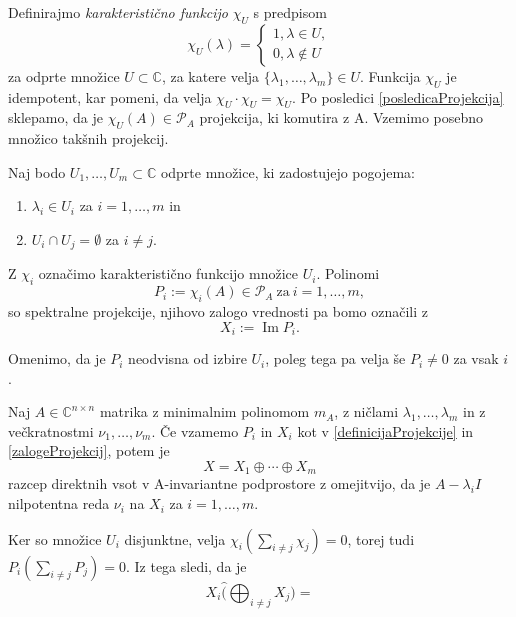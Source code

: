 \documentclass[mat1]{fmfdelo}
\newcommand{\C}{\mathbb C}
\DeclareMathOperator{\Ima}{Im}
\begin{document}
Definirajmo \emph{karakteristično funkcijo} $\chi_U$ s predpisom
\begin{equation}
    \chi_U(\lambda) =
    \begin{cases}
        1, \lambda \in U, \\
        0, \lambda \notin U
    \end{cases}
\end{equation}
za odprte množice $U \subset \C$, za katere velja $\{\lambda_1, \ldots, \lambda_m\} \in U$. Funkcija $\chi_U$ je idempotent, kar pomeni, da velja $\chi_U \cdot \chi_U = \chi_U$. Po posledici \ref{posledicaProjekcija} sklepamo, da je $\chi_U(A) \in \mathcal{P}_A$ projekcija, ki komutira z A. Vzemimo posebno množico takšnih projekcij.
\begin{definicija}
Naj bodo $U_1, \ldots, U_m \subset \C$ odprte množice, ki zadostujejo pogojema:
\begin{enumerate}
    \item $\lambda_i \in U_i$ za $i = 1,\ldots,m$ in
    \item $U_i \cap U_j = \emptyset$ za $i \neq j$.
\end{enumerate}
Z $\chi_i$ označimo karakteristično funkcijo množice $U_i$. Polinomi
\begin{equation} \label{definicijaProjekcije}
    P_i := \chi_i(A) \in \mathcal{P}_A\ \text{za}\ i = 1,\ldots, m,
\end{equation}
so {spektralne projekcije}, njihovo zalogo vrednosti pa bomo označili z 
\begin{equation} \label{zalogeProjekcij}
    X_i := \Ima P_i.
\end{equation}
\end{definicija}
Omenimo, da je $P_i$ neodvisna od izbire $U_i$, poleg tega pa velja še $P_i \neq 0$ za vsak $i$.

\begin{trditev}
    Naj $A \in \C^{n \times n}$ matrika z minimalnim polinomom $m_A$, z ničlami $\lambda_1, \ldots, \lambda_m$ in z večkratnostmi $\nu_1, \ldots, \nu_m$. Če vzamemo $P_i$ in $X_i$ kot v \eqref{definicijaProjekcije} in \eqref{zalogeProjekcij}, potem je
    \begin{equation}
        X = X_1 \oplus \cdots \oplus X_m
    \end{equation}
    razcep direktnih vsot v A-invariantne podprostore z omejitvijo, da je $A - \lambda_i I$ nilpotentna reda $\nu_i$ na $X_i$ za $i = 1, \ldots, m$.
\end{trditev}
\begin{dokaz}
    Ker so množice $U_i$ disjunktne, velja $\chi_i(\sum_{i \neq j} \chi_j) = 0$, torej tudi $P_i(\sum_{i \neq j} P_j) = 0$. Iz tega sledi, da je
    \begin{equation}
        X_i \hat (\bigoplus_{i \neq j} X_j) = {}
    \end{equation}
\end{dokaz}
\end{document}

